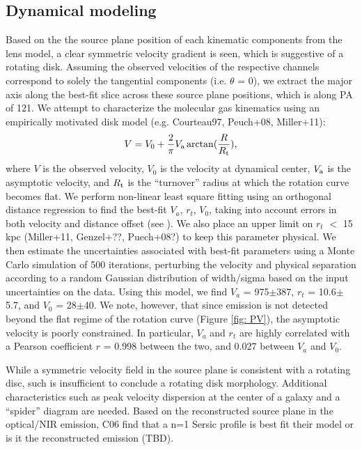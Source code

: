 \documentclass[]{emulateapj}
\begin{document}
\subsection{\bco Dynamical modeling} \label{sec:dynamics}
Based on the the source plane position of each kinematic components from the
lens model, a clear symmetric velocity gradient is seen, which is suggestive of a rotating disk. Assuming the observed velocities of the respective channels
correspond to solely the tangential components (i.e. $\theta$ = 0), we extract
the major axis along the best-fit slice across these source plane positions,
which is along PA of 121\degr.
We attempt to characterize the molecular gas kinematics using an empirically motivated disk model (e.g. Courteau97, Peuch+08, Miller+11):
\begin{equation}
V = V_0 + \frac{2}{\pi} V_{\rm a} \arctan(\frac{R}{R_{\rm t}}),
\end{equation}
where $V$ is the observed velocity, $V_0$ is the velocity at dynamical center, $V_{\rm a}$ is the asymptotic velocity, and $R_{\rm t}$ is the ``turnover'' radius at which the rotation curve
becomes flat. We perform non-linear least square fitting using an orthogonal distance regression to find the best-fit $V_a$, $r_t$, $V_0$, taking into account
errors in both velocity and distance offset (see ). We also place an upper limit on $r_t$ $<$ 15 kpc (Miller+11, Genzel+??, Puech+08?) to keep this
parameter physical. We then estimate the uncertainties associated with best-fit parameters using a Monte Carlo simulation of 500 iterations, perturbing
the velocity and physical separation according to a random Gaussian distribution of width/sigma based on the input uncertainties on
the data. Using this model, we find $V_a$ = 975$\pm$387, $r_t$ = 10.6$\pm$5.7,
and $V_0$ = 28$\pm$40. We note, however, that since emission is not detected beyond the flat regime of the rotation curve (Figure \ref{fig: PV}), the asymptotic velocity is
poorly constrained. In particular, $V_a$ and $r_t$ are highly correlated with a Pearson coefficient $r$ = 0.998 between the two, and 0.027 between $V_a$ and $V_0$.

While a symmetric velocity field in the source plane is consistent with a rotating disc, such is insufficient to conclude a rotating disk morphology. Additional characteristics such
as peak velocity dispersion at the center of a galaxy and a ``spider'' diagram are needed. Based on the reconstructed source plane in the optical/NIR emission, C06 find that a
n=1 Sersic profile is best fit their model or is it the reconstructed emission (TBD).
\end{document}
